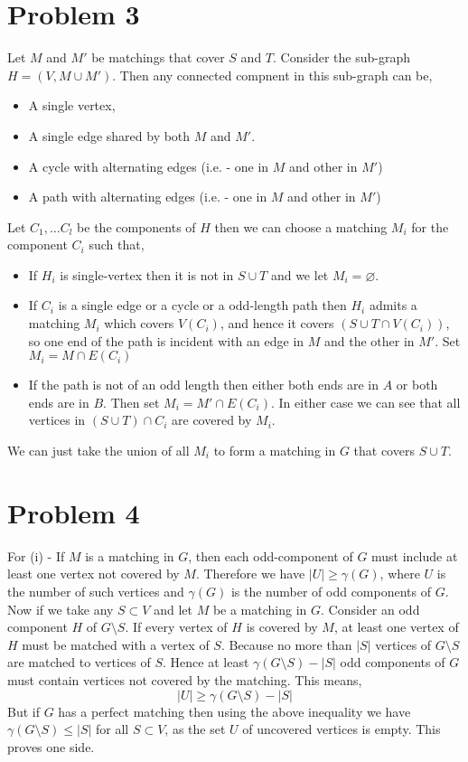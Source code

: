 \documentclass{article}
\numberwithin{equation}{section}
\newcommand{\card}[1]{\left|#1\right|}
\begin{document}
\section*{Problem 3}
Let $M$ and $M'$ be matchings that cover $S$ and $T$. Consider the sub-graph $H = (V, M \cup M')$. Then any connected compnent in this sub-graph can be, 
\begin{itemize}
    \item A single vertex, 
    \item A single edge shared by both $M$ and $M'$.
    \item A cycle with alternating edges (i.e. - one in $M$ and other in $M'$)
    \item A path with alternating edges (i.e. - one in $M$ and other in $M'$)
\end{itemize}
Let $C_1, \dots C_l$ be the components of $H$ then we can choose a matching $M_i$ for the component $C_i$ such that,
\begin{itemize}
    \item If $H_i$ is single-vertex then it is not in $S \cup T$ and we let $M_i = \varnothing$. 
    \item If $C_i$ is a single edge or a cycle or a odd-length path then $H_i$ admits a matching $M_i$ which covers $V(C_i)$, and hence it covers $(S\cup T \cap V(C_i))$, so one end of the path is incident with an edge in $M$ and the other in $M'$. Set $M_i = M \cap E(C_i)$
    \item If the path is not of an odd length then either both ends are in $A$ or both ends are in $B$. Then set $M_i = M'\cap E(C_i)$. In either case we can see that all vertices in $(S \cup T)\cap C_i$ are covered by $M_i$. 
\end{itemize}
We can just take the union of all $M_i$ to form a matching in $G$ that covers $S \cup T$.
\newpage
\section*{Problem 4}
For (i) - If $M$ is a matching in $G$, then each odd-component of $G$ must include at least one vertex not covered by $M$. Therefore we have $\card{U} \ge \gamma(G)$, where $U$ is the number of such vertices and $\gamma(G)$ is the number of odd components of $G$. Now if we take any $S \subset V$ and let $M$ be a matching in $G$. Consider an odd component $H$ of $G\setminus S$. If every vertex of $H$ is covered by $M$, at least one vertex of $H$ must be matched with a vertex of $S$. Because no more than $\card{S}$ vertices of $G\setminus S$ are matched to vertices of $S$. Hence at least $\gamma(G\setminus S)-\card{S}$ odd components of $G$ must contain vertices not covered by the matching. This means, 
\begin{equation}
    \label{e2}
    \card{U} \ge \gamma(G\setminus S) - \card{S}
\end{equation}
But if $G$ has a perfect matching then using the above inequality we have $\gamma(G\setminus S) \le \card{S}$ for all $S\subset V$, as the set $U$ of uncovered vertices is empty. This proves one side. 
\end{document}

